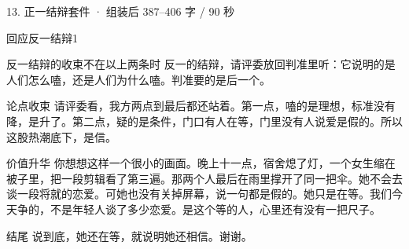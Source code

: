 \documentclass[script,pro]{debate}
\begin{document}
\begin{kit}{13. 正一结辩}{套件 · 组装后 387–406 字 / 90 秒}
\begin{pick}{回应反一结辩}{1}
\begin{fallback}{反一结辩的收束不在以上两条时}
反一的结辩，请评委放回判准里听：它说明的是人们怎么嗑，还是人们为什么嗑。判准要的是后一个。
\end{fallback}
\end{pick}
\begin{fixed}{论点收束}
请评委看，我方两点到最后都还站着。第一点，嗑的是理想，标准没有降，是升了。第二点，疑的是条件，门口有人在等，门里没有人说爱是假的。所以这股热潮底下，是信。
\end{fixed}
\begin{fixed}{价值升华}
你想想这样一个很小的画面。晚上十一点，宿舍熄了灯，一个女生缩在被子里，把一段剪辑看了第三遍。那两个人最后在雨里撑开了同一把伞。她不会去谈一段将就的恋爱。可她也没有关掉屏幕，说一句都是假的。她只是在等。我们今天争的，不是年轻人谈了多少恋爱。是这个等的人，心里还有没有一把尺子。
\end{fixed}
\begin{fixed}{结尾}
说到底，她还在等，就说明她还相信。谢谢。
\end{fixed}
\end{kit}
\begin{contingency}
\end{contingency}
\end{document}

